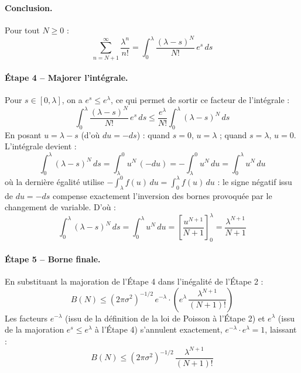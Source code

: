 \documentclass{article}
\begin{document}
\paragraph{Conclusion.} Pour tout $N\geq 0$ :
\begin{equation}
\sum_{n=N+1}^{\infty} \frac{\lambda^n}{n!} = \int_0^\lambda \frac{(\lambda-s)^N}{N!}\, e^s\, ds
\end{equation}
\paragraph{Étape 4 -- Majorer l'intégrale.} Pour $s\in[0,\lambda]$, on a $e^s\leq e^\lambda$, ce qui permet de sortir ce facteur de l'intégrale :
\begin{equation}
\int_0^\lambda \frac{(\lambda-s)^N}{N!}\, e^s\, ds \leq \frac{e^\lambda}{N!}\int_0^\lambda (\lambda-s)^N\, ds
\end{equation}
En posant $u=\lambda-s$ (d'où $du=-ds$) : quand $s=0$, $u=\lambda$ ; quand $s=\lambda$, $u=0$. L'intégrale devient :
\begin{equation}
\int_0^\lambda (\lambda-s)^N\, ds = \int_{\lambda}^{0} u^N\, (-du) = -\int_\lambda^0 u^N\, du = \int_0^\lambda u^N\, du
\end{equation}
où la dernière égalité utilise $-\int_\lambda^0 f(u)\,du = \int_0^\lambda f(u)\,du$ : le signe négatif issu de $du=-ds$ compense exactement l'inversion des bornes provoquée par le changement de variable. D'où :
\begin{equation}
\int_0^\lambda (\lambda-s)^N\, ds = \int_0^\lambda u^N\, du = \left[\frac{u^{N+1}}{N+1}\right]_0^\lambda = \frac{\lambda^{N+1}}{N+1}
\end{equation}
\paragraph{Étape 5 -- Borne finale.} En substituant la majoration de l'Étape 4 dans l'inégalité de l'Étape 2 :
\begin{equation}
B(N) \leq (2\pi\sigma^2)^{-1/2}\, e^{-\lambda} \cdot \left(e^\lambda\,\frac{\lambda^{N+1}}{(N+1)!}\right)
\end{equation}
Les facteurs $e^{-\lambda}$ (issu de la définition de la loi de Poisson à l'Étape 2) et $e^\lambda$ (issu de la majoration $e^s\leq e^\lambda$ à l'Étape 4) s'annulent exactement, $e^{-\lambda}\cdot e^\lambda = 1$, laissant :
\begin{equation}
B(N) \leq (2\pi\sigma^2)^{-1/2}\,\frac{\lambda^{N+1}}{(N+1)!}
\end{equation}
\end{document}
